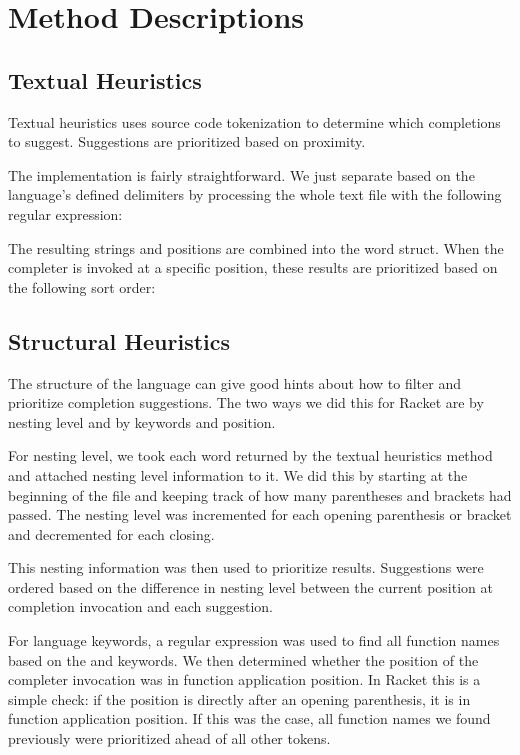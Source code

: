 \documentclass[ms,electronic,twosidetoc,letterpaper,chaptercenter,parttop,lol,lof,lot]{byumsphd}
\begin{document}
\section{Method Descriptions}

\subsection{Textual Heuristics}

Textual heuristics uses source code tokenization to determine which completions to
suggest. Suggestions are prioritized based on proximity.

The implementation is fairly straightforward. We just separate based on the language's
defined delimiters by processing the whole text file with the following regular
expression: \scheme{[^\s()[]",'`#|\;]+}

The resulting strings and positions are combined into the word struct. When the completer
is invoked at a specific position, these results are prioritized based on the following
sort order:


\subsection{Structural Heuristics}

The structure of the language can give good hints about how to filter and prioritize
completion suggestions. The two ways we did this for Racket are by nesting level and by
keywords and position.

For nesting level, we took each word returned by the textual heuristics method and
attached nesting level information to it. We did this by starting at the beginning of the
file and keeping track of how many parentheses and brackets had passed. The nesting level
was incremented for each opening parenthesis or bracket and decremented for each closing.

This nesting information was then used to prioritize results. Suggestions were ordered
based on the difference in nesting level between the current position at completion
invocation and each suggestion.

For language keywords, a regular expression was used to find all function names based on
the  and  keywords. We then determined whether the position of
the completer invocation was in function application position. In Racket this is a simple
check: if the position is directly after an opening parenthesis, it is in function
application position. If this was the case, all function names we found previously were
prioritized ahead of all other tokens.
\end{document}
